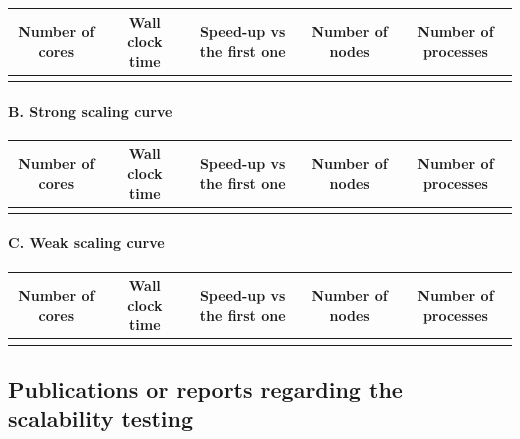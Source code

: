 \documentclass[a4paper,12pt]{article}
\makeatletter
\newif\ifshowinstructions
\newcommand{\instructions}[1]{\ifshowinstructions {\fontsize{10}{11}\selectfont \textit{#1}} \fi}
\newenvironment{jubox}
  {
    \begin{mdframed}
    \globalcolor{blue}
  }
  {
    \end{mdframed}
  }
\newcommand{\globalcolor}[1]{%
  \color{#1}\global\let\default@color\current@color
}
\makeatother
\begin{document}
\begin{tabulary}{0.90\textwidth}{|c|c|c|c|c|}
  \hline
  Number of cores & Wall clock time & Speed-up vs the first one & Number of nodes & Number of processes \\
  \hline
                  &                 &                            &                 &                     \\
  \hline
\end{tabulary}

\paragraph*{\textbf{B. Strong scaling curve}}

\instructions{Please include the data in order to deploy the scalability curve when the number of processors varies for a fixed total problem size.}

\begin{tabulary}{0.90\textwidth}{|c|c|c|c|c|}
  \hline
  Number of cores & Wall clock time & Speed-up vs the first one & Number of nodes & Number of processes \\
  \hline
                  &                 &                            &                 &                     \\
  \hline
\end{tabulary}

\paragraph*{\textbf{C. Weak scaling curve}}

\instructions{Please include the data in order to deploy the scalability curve when the number of processors varies for a fixed problem size per processor.}

\begin{tabulary}{0.90\textwidth}{|c|c|c|c|c|}
  \hline
  Number of cores & Wall clock time & Speed-up vs the first one & Number of nodes & Number of processes \\
  \hline
                  &                 &                            &                 &                     \\
  \hline
\end{tabulary}

\subsection{Publications or reports regarding the scalability testing}

\instructions{Please use the following format: Author(s). ``Title''. Publication, volume, issue, page, month year.}

\begin{jubox}
\end{jubox}
\end{document}
